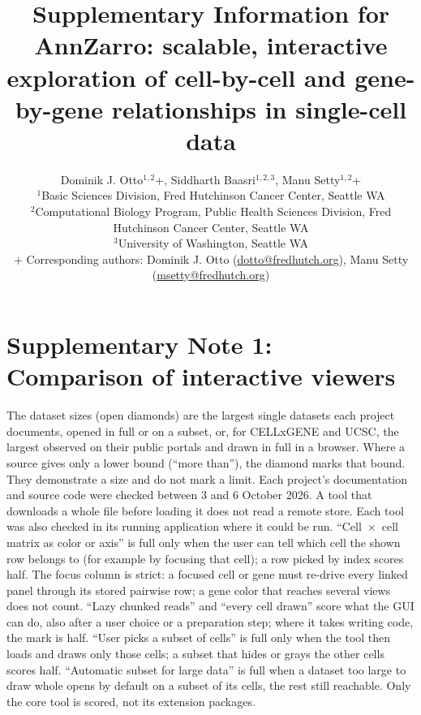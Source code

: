 \documentclass[11pt]{article}
\title{Supplementary Information for\\ AnnZarro: scalable, interactive exploration of cell-by-cell and gene-by-gene relationships in single-cell data}
\author{\hspace*{-\tabcolsep}\parbox{\textwidth}{\raggedright\normalsize
Dominik J. Otto$^{1,2}$+, Siddharth Baasri$^{1,2,3}$, Manu Setty$^{1,2}$+\\[8pt]
$^{1}$Basic Sciences Division, Fred Hutchinson Cancer Center, Seattle WA\\
$^{2}$Computational Biology Program, Public Health Sciences Division, Fred Hutchinson Cancer Center, Seattle WA\\
$^{3}$University of Washington, Seattle WA\\[12pt]
+ Corresponding authors: Dominik J. Otto (\href{mailto:dotto@fredhutch.org}{dotto@fredhutch.org}), Manu Setty (\href{mailto:msetty@fredhutch.org}{msetty@fredhutch.org})}\hspace*{-\tabcolsep}}
\date{}
\begin{document}
\maketitle

\section*{Supplementary Note 1: Comparison of interactive viewers}
The dataset sizes (open diamonds) are the largest single datasets each project documents, opened in full or on a subset, or, for CELLxGENE and UCSC, the largest observed on their public portals and drawn in full in a browser. Where a source gives only a lower bound (``more than''), the diamond marks that bound. They demonstrate a size and do not mark a limit. Each project's documentation and source code were checked between 3 and 6 October 2026.
A tool that downloads a whole file before loading it does not read a remote store. Each tool was also checked in its running application where it could be run. ``Cell~$\times$~cell matrix as color or axis'' is full only when the user can tell which cell the shown row belongs to (for example by focusing that cell); a row picked by index scores half. The focus column is strict: a focused cell or gene must re-drive every linked panel through its stored pairwise row; a gene color that reaches several views does not count. ``Lazy chunked reads'' and ``every cell drawn'' score what the GUI can do, also after a user choice or a preparation step; where it takes writing code, the mark is half. ``User picks a subset of cells'' is full only when the tool then loads and draws only those cells; a subset that hides or grays the other cells scores half. ``Automatic subset for large data'' is full when a dataset too large to draw whole opens by default on a subset of its cells, the rest still reachable. Only the core tool is scored, not its extension packages.
\end{document}
